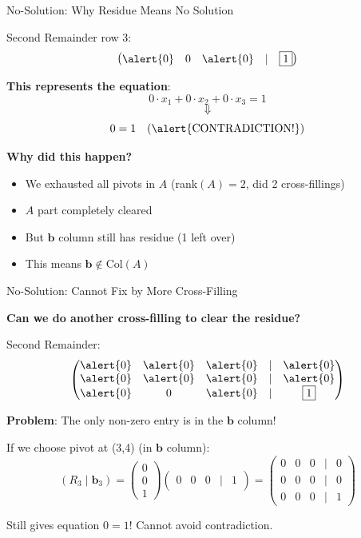 \documentclass[10pt]{beamer}
\theoremstyle{definition}
\newcommand{\x}[1]{\alert{\textbf{#1}}}
\begin{document}
\begin{frame}{No-Solution: Why Residue Means No Solution}

Second Remainder row 3:
$$\begin{pmatrix} \alert{0} & 0 & \alert{0} & | & \boxed{1} \end{pmatrix}$$

\vspace{1em}

\x{This represents the equation}:
$$0 \cdot x_1 + 0 \cdot x_2 + 0 \cdot x_3 = 1$$
$$\Downarrow$$
$$0 = 1 \quad \text{(\alert{CONTRADICTION!})}$$

\vspace{1em}

\x{Why did this happen?}
\begin{itemize}
\item We exhausted all pivots in $A$ (rank$(A) = 2$, did 2 cross-fillings)
\item $A$ part completely cleared
\item But $\mathbf{b}$ column still has residue (1 left over)
\item \alert{This means $\mathbf{b} \notin \text{Col}(A)$}
\end{itemize}

\end{frame}

\begin{frame}{No-Solution: Cannot Fix by More Cross-Filling}

\x{Can we do another cross-filling to clear the residue?}

\vspace{1em}

Second Remainder:
$$\begin{pmatrix}
\alert{0} & \alert{0} & \alert{0} & | & \alert{0} \\
\alert{0} & \alert{0} & \alert{0} & | & \alert{0} \\
\alert{0} & 0 & \alert{0} & | & \boxed{1}
\end{pmatrix}$$

\vspace{1em}

\x{Problem}: The only non-zero entry is in the $\mathbf{b}$ column!

\vspace{1em}

If we choose pivot at (3,4) (in $\mathbf{b}$ column):
$$(R_3 \mid \mathbf{b}_3) = \begin{pmatrix} 0 \\ 0 \\ 1 \end{pmatrix} \begin{pmatrix} 0 & 0 & 0 & | & 1 \end{pmatrix} = \begin{pmatrix}
0 & 0 & 0 & | & 0 \\
0 & 0 & 0 & | & 0 \\
0 & 0 & 0 & | & 1
\end{pmatrix}$$

Still gives equation $0 = 1$! \alert{Cannot avoid contradiction.}

\end{frame}
\end{document}

